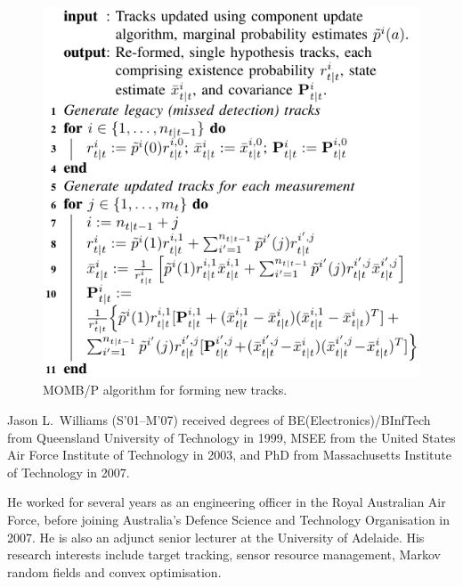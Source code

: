 \documentclass[journal,twoside]{IEEEtran}
\theoremstyle{plain}
\begin{document}
\begin{figure}
\includegraphics{figure11.pdf}
\caption{MOMB/P algorithm for forming new tracks.}
\label{fig:algMOMMeMBerP}
\end{figure}

\ifCLASSOPTIONdraftcls
\else
\fi

{\small{
}}

\ifCLASSOPTIONdraftcls
\else
\vfill
\fi

\begin{IEEEbiography}{Jason L.\ Williams} (S'01--M'07) received degrees of BE(Electronics)/BInfTech from Queensland University of Technology in 1999, MSEE from the United States Air Force Institute of Technology in 2003, and PhD from Massachusetts Institute of Technology in 2007. 

He worked for several years as an engineering officer in the Royal Australian Air Force, before joining Australia's Defence Science and Technology Organisation in 2007. He is also an adjunct senior lecturer at the University of Adelaide. His research interests include target tracking, sensor resource management, Markov random fields and convex optimisation. 
\end{IEEEbiography}
\end{document}
